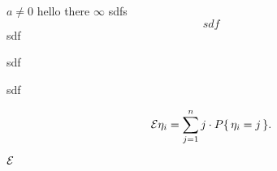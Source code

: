 $$\newcommand{\E}{\mathcal{E}}$$
$$\newcommand{\set}[1]{\{\,#1\,\}}$$
$$\newcommand{\P}[1]{P\set{#1}}$$

\(a \ne 0\) hello there $\infty$ sdfs
\[sdf\]
sdf

sdf

sdf

$$ \E \eta_i = \sum_{j = 1}^{n} j\cdot \P{\eta_i = j}.$$

$\E$
